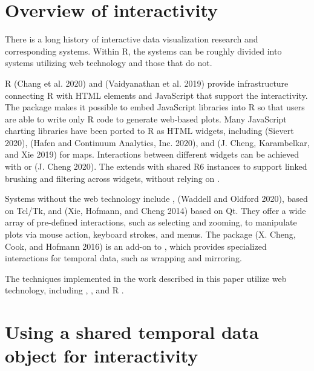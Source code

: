\hypertarget{overview-of-interactivity}{%
\section{Overview of interactivity}\label{overview-of-interactivity}}

There is a long history of interactive data visualization research and corresponding systems. Within R, the systems can be roughly divided into systems utilizing web technology and those that do not.

R  (Chang et al. 2020) and  (Vaidyanathan et al. 2019) provide infrastructure connecting R with HTML elements and JavaScript that support the interactivity. The  package makes it possible to embed JavaScript libraries into R so that users are able to write only R code to generate web-based plots. Many JavaScript charting libraries have been ported to R as HTML widgets, including  (Sievert 2020),  (Hafen and Continuum Analytics, Inc. 2020), and  (J. Cheng, Karambelkar, and Xie 2019) for maps. Interactions between different widgets can be achieved with  or  (J. Cheng 2020). The  extends  with shared R6 instances to support linked brushing and filtering across widgets, without relying on .

Systems without the web technology include ,  (Waddell and Oldford 2020), based on Tcl/Tk, and  (Xie, Hofmann, and Cheng 2014) based on Qt. They offer a wide array of pre-defined interactions, such as selecting and zooming, to manipulate plots via mouse action, keyboard strokes, and menus. The  package (X. Cheng, Cook, and Hofmann 2016) is an add-on to , which provides specialized interactions for temporal data, such as wrapping and mirroring.

The techniques implemented in the work described in this paper utilize web technology, including , , and R .

\hypertarget{using-a-shared-temporal-data-object-for-interactivity}{%
\section{Using a shared temporal data object for interactivity}\label{using-a-shared-temporal-data-object-for-interactivity}}

